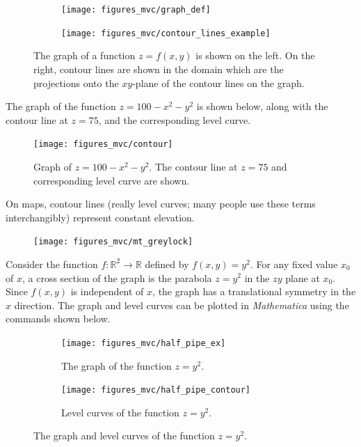 \documentclass[12pt,letterpaper,reqno]{article}
\numberwithin{equation}{section}
\begin{document}
{\begin{figure}[h]
\centering
\begin{subfigure}{.5\textwidth}
  \centering
  \texttt{[image: figures\_mvc/graph\_def]}
\end{subfigure}%
\begin{subfigure}{.5\textwidth}
  \centering
  \texttt{[image: figures\_mvc/contour\_lines\_example]}
\end{subfigure}
\caption{The graph of a function $z=f(x,y)$ is shown on the left. On the right, contour lines are shown in the domain which are the projections onto the $xy$-plane of the contour lines on the graph.}
\end{figure}

\newpage
\begin{example}
The graph of the function $z=100-x^2-y^2$ is shown below, along with the contour line at $z=75$, and the corresponding level curve.
\begin{figure}[h]
	\begin{center}
	\texttt{[image: figures\_mvc/contour]}
\end{center}
\caption{Graph of $z=100-x^2-y^2$. The contour line at $z=75$ and corresponding level curve are shown.}
\end{figure}
	
\end{example}
\begin{example}
	On maps, contour lines (really level curves; many people use these terms interchangibly) represent constant elevation.
	\begin{figure}[h]
		\begin{center}
		\texttt{[image: figures\_mvc/mt\_greylock]}
	\end{center}
	\end{figure}
\end{example}
\newpage 
\begin{example}
Consider the function $f:\mathbb{R}^2 \to \mathbb{R}$ defined by $f(x,y)=y^2$. For any fixed value $x_0$ of $x$, a cross section of the graph is the parabola $z=y^2$ in the $zy$ plane at $x_0$. Since $f(x,y)$ is independent of $x$, the graph has a translational symmetry in the $x$ direction. The graph and level curves can be plotted in \emph{Mathematica} using the commands shown below.

	\begin{figure}[h]
\centering
\begin{subfigure}{.5\textwidth}
  \centering
  \texttt{[image: figures\_mvc/half\_pipe\_ex]}
  \caption{The graph of the function $z=y^2$.}
\end{subfigure}%
\begin{subfigure}{.5\textwidth}
  \centering
  \texttt{[image: figures\_mvc/half\_pipe\_contour]}
  \caption{Level curves of the function $z=y^2$.}
\end{subfigure}
\caption{The graph and level curves of the function $z=y^2$.}
\end{figure}
\end{example}

}
\end{document}
